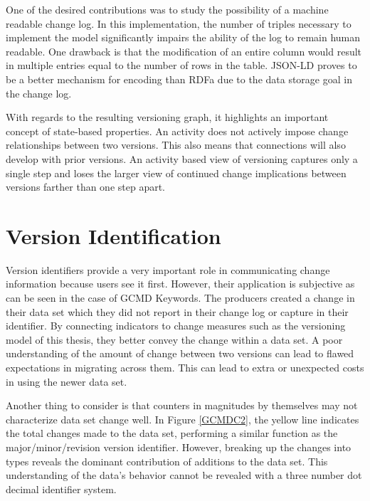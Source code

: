 One of the desired contributions was to study the possibility of a machine readable change log.
In this implementation, the number of triples necessary to implement the model significantly impairs the ability of the log to remain human readable.
One drawback is that the modification of an entire column would result in multiple entries equal to the number of rows in the table.
JSON-LD proves to be a better mechanism for encoding than RDFa due to the data storage goal in the change log.

With regards to the resulting versioning graph, it highlights an important concept of state-based properties.
An activity does not actively impose change relationships between two versions.
This also means that connections will also develop with prior versions.
An activity based view of versioning captures only a single step and loses the larger view of continued change implications between versions farther than one step apart.

\section{Version Identification}

Version identifiers provide a very important role in communicating change information because users see it first.
However, their application is subjective as can be seen in the case of GCMD Keywords.
The producers created a change in their data set which they did not report in their change log or capture in their identifier.
By connecting indicators to change measures such as the versioning model of this thesis, they better convey the change within a data set.
A poor understanding of the amount of change between two versions can lead to flawed expectations in migrating across them.
This can lead to extra or unexpected costs in using the newer data set.

Another thing to consider is that counters in magnitudes by themselves may not characterize data set change well.
In Figure \ref{GCMDC2}, the yellow line indicates the total changes made to the data set, performing a similar function as the major/minor/revision version identifier.
However, breaking up the changes into types reveals the dominant contribution of additions to the data set.
This understanding of the data's behavior cannot be revealed with a three number dot decimal identifier system.
